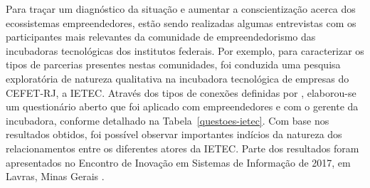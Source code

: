 Para traçar um diagnóstico da situação e aumentar a conscientização acerca dos ecossistemas empreendedores, estão sendo realizadas algumas entrevistas com os participantes mais relevantes da comunidade de empreendedorismo das incubadoras tecnológicas dos institutos federais. Por exemplo, para caracterizar os tipos de parcerias presentes nestas comunidades, foi conduzida uma pesquisa exploratória de natureza qualitativa na incubadora tecnológica de empresas do CEFET-RJ, a IETEC. Através dos tipos de conexões definidas por , elaborou-se um questionário aberto que foi aplicado com empreendedores e com o gerente da incubadora, conforme detalhado na Tabela~\ref{questoes-ietec}. Com base nos resultados obtidos, foi possível observar importantes indícios da natureza dos relacionamentos entre os diferentes atores da IETEC. Parte dos resultados foram apresentados no Encontro de Inovação em Sistemas de Informação de 2017, em Lavras, Minas Gerais \cite{escalfoni-irineu-oliveira:2017}.

